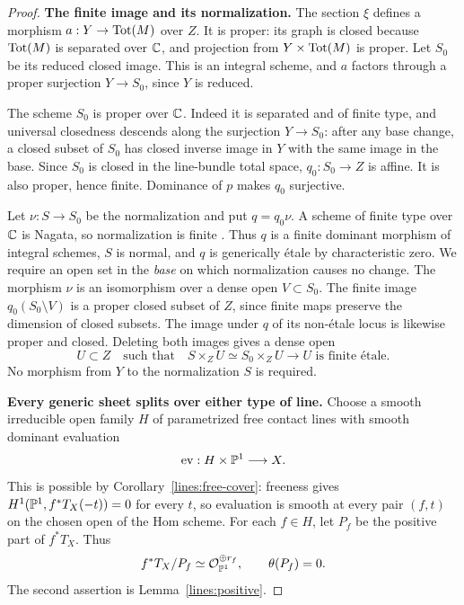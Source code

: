 \begin{proof}
\noindent\textbf{The finite image and its normalization.}
The section $\xi$ defines a morphism
$a:Y\to\operatorname{Tot}(M)$ over $Z$. It is proper: its graph is closed because
$\operatorname{Tot}(M)$ is separated over $\mathbb C$, and projection from
$Y\times\operatorname{Tot}(M)$ is proper. Let $S_0$ be its reduced closed image.
This is an integral scheme, and $a$ factors through a proper surjection
$Y\to S_0$, since $Y$ is reduced.

The scheme $S_0$ is proper over $\mathbb C$. Indeed it is separated and of
finite type, and universal closedness descends along the surjection
$Y\to S_0$: after any base change, a closed subset of $S_0$ has
closed inverse image in $Y$ with the same image in the base. Since
$S_0$ is closed in the line-bundle total space, $q_0:S_0\to Z$ is
affine. It is also proper, hence finite. Dominance of $p$ makes $q_0$
surjective.

Let $\nu:S\to S_0$ be the normalization and put $q=q_0\nu$.
A scheme of finite type over $\mathbb C$ is Nagata, so normalization is
finite \cite[Tags  and ]{Stacks}. Thus $q$ is a finite
dominant morphism of integral schemes, $S$ is normal, and $q$ is
generically \'etale by characteristic zero.
We require an open set in the \emph{base} on which normalization
causes no change. The morphism $\nu$ is an isomorphism over a dense
open $V\subset S_0$. The finite image $q_0(S_0\setminus V)$ is a
proper closed subset of $Z$, since finite maps preserve the dimension
of closed subsets. The image under $q$ of its non-\'etale locus is
likewise proper and closed. Deleting both images gives a dense open
\begin{equation}\label{des:base-open}
U\subset Z\quad\text{such that}\quad
S\times_ZU\simeq S_0\times_ZU\longrightarrow U
\text{ is finite \'etale}.
\end{equation}
No morphism from $Y$ to the normalization $S$ is required.

\medskip
\noindent\textbf{Every generic sheet splits over either type of line.}
Choose a smooth irreducible open family $H$ of parametrized free contact
lines with smooth dominant evaluation
\[
\operatorname{ev}:H\times\mathbb P^1\longrightarrow X.
\]
This is possible by Corollary~\ref{lines:free-cover}: freeness gives
$H^1(\mathbb P^1,f^*T_X(-t))=0$ for every $t$, so evaluation is smooth at
every pair $(f,t)$ on the chosen open of the Hom scheme. For each
$f\in H$, let $P_f$ be the positive part of $f^*T_X$. Thus
\begin{equation}\label{des:line-quotient}
f^*T_X/P_f\simeq\mathcal O_{\mathbb P^1}^{\oplus r_f},
\qquad \theta(P_f)=0.
\end{equation}
The second assertion is Lemma~\ref{lines:positive}.



\end{proof}
